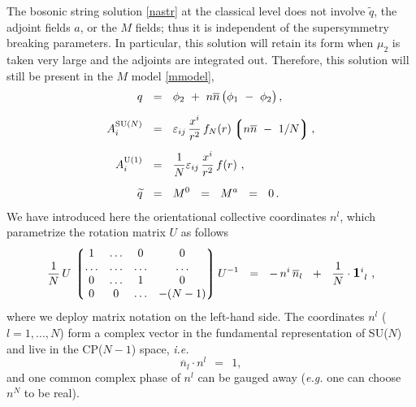 \documentclass[12pt]{article}
\def\beq{\begin{equation}}
\def\eeq{\end{equation}}
\newcommand{\wt}{\widetilde}
\newcommand{\ov}{\overline}
\newcommand{\lgr}{\left\lgroup}
\newcommand{\rgr}{\right\rgroup}
\newcommand{\nbar}{\ov{n}}
\begin{document}
	The bosonic string solution \eqref{nastr} at the classical level
	does not involve $ \wt{q} $, the adjoint fields $ a $,
	or the $ M $ fields;  thus it is independent of the supersymmetry
	breaking parameters.
	In particular, this solution will retain its form when $ \mu_2 $ is taken very large and the 
	adjoints are integrated out.
	Therefore, this solution will still be present in the $M$ model \eqref{mmodel}, 
\begin{align}
%
\notag
	q & ~~=~~ 
		\phi_2 ~+~ n\nbar\, \bigl( \phi_1 ~-~ \phi_2 \bigr) \,,
	\\[2mm]
%
\label{str}
	A_i^\text{SU($N$)} & ~~=~~ \varepsilon_{ij}\, \frac{x^i}{r^2}\, f_{N}(r)
				\lgr n\nbar ~-~ 1/N \rgr,
	\\[2mm]
%
\notag
	A_i^{\rm U(1)} & ~~=~~ \frac{1}{N}\varepsilon_{ij}\, \frac{x^i}{r^2}\, f(r)~, 
	\\[2mm]
%
\notag
	\wt{q} & ~~=~~ M^0 ~~=~~ M^a ~~=~~ 0\,.
\end{align}
	We have introduced here the orientational collective coordinates $ n^l $, which
	parametrize the rotation matrix $ U $ as follows
\beq
\label{n}
	\frac{1}{N}\, U \, \lgr \begin{matrix}
				  1  & \ldots & 0 & 0 \\
				  \ldots & \ldots & \ldots & \ldots \\
				  0 & \ldots & 1 & 0  \\
				  0 & 0 & \ldots & -(N-1) 
				\end{matrix} \rgr
			U^{-1}  
	~~=~~
	-\, n^i\,\ov{n}{}_l  ~~+~~ \frac{1}{N}\cdot{\mathlarger{\mathbf{1}}}{}^i_{~l} ~,
\eeq
	where we deploy matrix notation on the left-hand side.
	The coordinates $ n^l $ ($ l = 1, ..., N $) form a complex vector in the fundamental representation
	of SU($N$) and live in the CP($N-1$) space, {\it i.e.}
\beq
\label{unitvec}
		\ov{n}{}_l \cdot n^l ~~=~~ 1,
\eeq
	and one common complex phase of $ n^l $ can be gauged away ({\it e.g.} one can choose $ n^N $ to be real).
\end{document}
